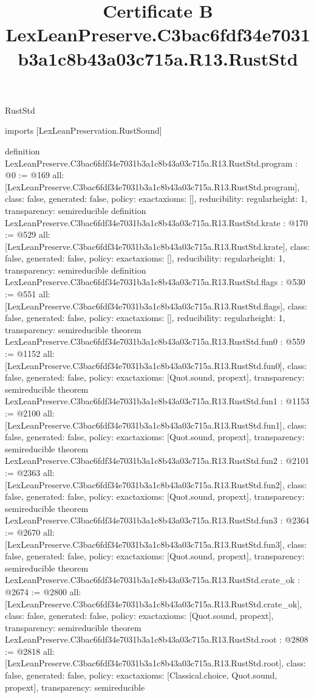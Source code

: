 \begin{lexlean}{RustStd}
\title{Certificate B LexLeanPreserve.C3bac6fdf34e7031b3a1c8b43a03c715a.R13.RustStd}
\begin{coremodule}
imports [LexLeanPreservation.RustSound]

definition LexLeanPreserve.C3bac6fdf34e7031b3a1c8b43a03c715a.R13.RustStd.program : @0 := @169 {
  all: [LexLeanPreserve.C3bac6fdf34e7031b3a1c8b43a03c715a.R13.RustStd.program],
  class: false,
  generated: false,
  policy: exact{axioms: []},
  reducibility: regular{height: 1},
  transparency: semireducible
}
definition LexLeanPreserve.C3bac6fdf34e7031b3a1c8b43a03c715a.R13.RustStd.krate : @170 := @529 {
  all: [LexLeanPreserve.C3bac6fdf34e7031b3a1c8b43a03c715a.R13.RustStd.krate],
  class: false,
  generated: false,
  policy: exact{axioms: []},
  reducibility: regular{height: 1},
  transparency: semireducible
}
definition LexLeanPreserve.C3bac6fdf34e7031b3a1c8b43a03c715a.R13.RustStd.flags : @530 := @551 {
  all: [LexLeanPreserve.C3bac6fdf34e7031b3a1c8b43a03c715a.R13.RustStd.flags],
  class: false,
  generated: false,
  policy: exact{axioms: []},
  reducibility: regular{height: 1},
  transparency: semireducible
}
theorem LexLeanPreserve.C3bac6fdf34e7031b3a1c8b43a03c715a.R13.RustStd.fun0 : @559 := @1152 {
  all: [LexLeanPreserve.C3bac6fdf34e7031b3a1c8b43a03c715a.R13.RustStd.fun0],
  class: false,
  generated: false,
  policy: exact{axioms: [Quot.sound, propext]},
  transparency: semireducible
}
theorem LexLeanPreserve.C3bac6fdf34e7031b3a1c8b43a03c715a.R13.RustStd.fun1 : @1153 := @2100 {
  all: [LexLeanPreserve.C3bac6fdf34e7031b3a1c8b43a03c715a.R13.RustStd.fun1],
  class: false,
  generated: false,
  policy: exact{axioms: [Quot.sound, propext]},
  transparency: semireducible
}
theorem LexLeanPreserve.C3bac6fdf34e7031b3a1c8b43a03c715a.R13.RustStd.fun2 : @2101 := @2363 {
  all: [LexLeanPreserve.C3bac6fdf34e7031b3a1c8b43a03c715a.R13.RustStd.fun2],
  class: false,
  generated: false,
  policy: exact{axioms: [Quot.sound, propext]},
  transparency: semireducible
}
theorem LexLeanPreserve.C3bac6fdf34e7031b3a1c8b43a03c715a.R13.RustStd.fun3 : @2364 := @2670 {
  all: [LexLeanPreserve.C3bac6fdf34e7031b3a1c8b43a03c715a.R13.RustStd.fun3],
  class: false,
  generated: false,
  policy: exact{axioms: [Quot.sound, propext]},
  transparency: semireducible
}
theorem LexLeanPreserve.C3bac6fdf34e7031b3a1c8b43a03c715a.R13.RustStd.crate_ok : @2674 := @2800 {
  all: [LexLeanPreserve.C3bac6fdf34e7031b3a1c8b43a03c715a.R13.RustStd.crate_ok],
  class: false,
  generated: false,
  policy: exact{axioms: [Quot.sound, propext]},
  transparency: semireducible
}
theorem LexLeanPreserve.C3bac6fdf34e7031b3a1c8b43a03c715a.R13.RustStd.root : @2808 := @2818 {
  all: [LexLeanPreserve.C3bac6fdf34e7031b3a1c8b43a03c715a.R13.RustStd.root],
  class: false,
  generated: false,
  policy: exact{axioms: [Classical.choice, Quot.sound, propext]},
  transparency: semireducible
}


\end{coremodule}
\end{lexlean}
